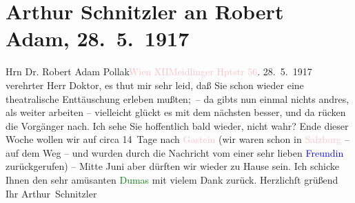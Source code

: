 

               \section[Arthur Schnitzler an Robert Adam, 28. 5. 1917]{ Arthur Schnitzler an Robert Adam, 28. 5. 1917}\nopagebreak{}\rehead{ }\normalsize\beginnumbering{} \toendnotes[C]{\smallbreak\pagebreak[2]} 
\toendnotes[C]{\smallbreak}\pstart{}{\pb}Hrn Dr. Robert Adam Pollak\pend{}\pstart{}\textcolor{pink}{Wien XII}{}\ledrightnote{\textcolor{pink}{XII., Meidling}}\pend{}\pstart{}\textcolor{pink}{Meidlinger Hptstr 56}{}\ledrightnote{\textcolor{pink}{Meidlinger Hauptstraße}}.\pend{}{\bigskip}\pstart
           \raggedleft{}{\pb}28. 5. 1917\pend
           \pstart{}verehrter Herr Doktor,\pend\pstart
           es thut mir sehr leid, daß Sie schon wieder eine theatralische Enttäuschung
                    erleben mußten; – da gibts nun einmal nichts andres, als weiter arbeiten –
                    vielleicht glückt es mit dem nächsten besser, und da{\geminationn} rücken die Vorgänger nach.\pend
           \pstart
           Ich sehe Sie hoffentlich bald wieder, nicht wahr? Ende dieser Woche wollen wir
                    auf circa 14 Tage nach \textcolor{pink}{Gastein}{}\ledrightnote{\textcolor{pink}{Bad Gastein}} (wir waren schon
                    in \textcolor{pink}{Salzburg}{}\ledrightnote{\textcolor{pink}{Salzburg}} – auf dem Weg – und wurden durch die
                    Nachricht vom \label{K_L02261_1v}\label{K_L02261_1h} einer sehr lieben \textcolor{blue}{Freundin}{} zurückgerufen) –
                        Mitte Juni aber dürften wir wieder zu Hause sein. Ich schicke
                    Ihnen den sehr amüsanten \textcolor{blue}{\textcolor{green}{Dumas}{}}{}\ledrightnote{\textcolor{blue}{Alexandre père Dumas}} mit vielem Dank zurück.\pend
           \pstart Herzlichſt grüßend Ihr \spacefill\mbox{Arthur Schnitzler}\pend{}\endnumbering{}  
      